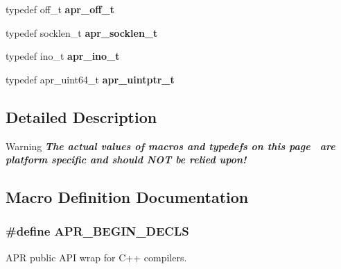 \begin{DoxyCompactItemize}
\item 
typedef off\+\_\+t {\bfseries apr\+\_\+off\+\_\+t}\hypertarget{group__apr__platform_ga6938af9075cec15c88299109381aa984}{}\label{group__apr__platform_ga6938af9075cec15c88299109381aa984}

\item 
typedef socklen\+\_\+t {\bfseries apr\+\_\+socklen\+\_\+t}\hypertarget{group__apr__platform_gab613b0701b7a8b0ccd1a3c157a800f27}{}\label{group__apr__platform_gab613b0701b7a8b0ccd1a3c157a800f27}

\item 
typedef ino\+\_\+t {\bfseries apr\+\_\+ino\+\_\+t}\hypertarget{group__apr__platform_ga0a5ae63884288a9f69f4e384a23bad68}{}\label{group__apr__platform_ga0a5ae63884288a9f69f4e384a23bad68}

\item 
typedef apr\+\_\+uint64\+\_\+t {\bfseries apr\+\_\+uintptr\+\_\+t}\hypertarget{group__apr__platform_gabf3268b941400de57926ee0f0ca56aa2}{}\label{group__apr__platform_gabf3268b941400de57926ee0f0ca56aa2}

\end{DoxyCompactItemize}


\subsection{Detailed Description}
\begin{DoxyWarning}{Warning}
{\bfseries {\itshape The actual values of macros and typedefs on this page~\newline
 are platform specific and should N\+OT be relied upon!}} 
\end{DoxyWarning}


\subsection{Macro Definition Documentation}
\subsubsection[{\texorpdfstring{A\+P\+R\+\_\+\+B\+E\+G\+I\+N\+\_\+\+D\+E\+C\+LS}{APR_BEGIN_DECLS}}]{\setlength{\rightskip}{0pt plus 5cm}\#define A\+P\+R\+\_\+\+B\+E\+G\+I\+N\+\_\+\+D\+E\+C\+LS}\hypertarget{group__apr__platform_gaa046c9c51a1af394db3a34dec1972630}{}\label{group__apr__platform_gaa046c9c51a1af394db3a34dec1972630}
A\+PR public A\+PI wrap for C++ compilers. 
